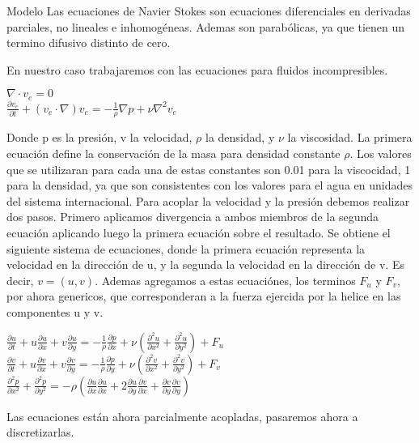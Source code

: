 
\begin{section}{Modelo}
Las ecuaciones de Navier Stokes son ecuaciones diferenciales en derivadas parciales, no lineales e inhomogéneas. Ademas son parabólicas, ya que tienen un termino difusivo distinto de cero.

En nuestro caso trabajaremos con las ecuaciones para fluidos incompresibles.
\begin{center}
$\nabla \cdot v_e = 0$\\
$\frac{\partial v_e}{\partial t} + (v_e \cdot \nabla)v_e = -\frac{1}{\rho}\nabla p+\nu \nabla^2v_e$
\end{center}

Donde p es la presión, v la velocidad, $\rho$ la densidad, y $\nu$ la viscosidad. La primera ecuación define la conservación de la masa para densidad constante $\rho$. 
Los valores que se utilizaran para cada una de estas constantes son 0.01 para la viscocidad, 1 para la densidad, ya que son consistentes con los valores para el agua en unidades del sistema internacional.
Para acoplar la velocidad y la presión debemos realizar dos pasos. Primero aplicamos divergencia a ambos miembros de la segunda ecuación aplicando luego la primera ecuación sobre el resultado. Se obtiene el siguiente sistema de ecuaciones, donde la primera ecuación representa la velocidad en la dirección de u, y la segunda la velocidad en la dirección de v. Es decir, $v=(u,v)$. Ademas agregamos a estas ecuaciónes, los terminos $F_u$ y $F_v$, por ahora genericos, que corresponderan a la fuerza ejercida por la helice en las componentes u y v.
~\\

\begin{center}

$\frac{\partial u}{\partial t} + u \frac{\partial u}{\partial x} + v \frac{\partial u}{\partial y} = -\frac{1}{\rho} \frac{\partial p}{\partial x} + \nu ( \frac{\partial ^2 u}{\partial x^2} + \frac{\partial ^2 u}{\partial y^2}) + F_u$
~\\
$\frac{\partial v}{\partial t} + u \frac{\partial v}{\partial x} + v \frac{\partial v}{\partial y} = -\frac{1}{\rho} \frac{\partial p}{\partial y} + \nu ( \frac{\partial ^2 v}{\partial x^2} + \frac{\partial ^2 v}{\partial y^2}) + F_v$
~\\
$\frac{\partial ^2 p}{\partial x^2} + \frac{\partial ^2 p}{\partial y^2} = - \rho(\frac{\partial u}{\partial x} \frac{\partial u}{\partial x}  + 2 \frac{\partial u}{\partial y}  \frac{\partial v}{\partial x} + \frac{\partial v}{\partial y} \frac{\partial v}{\partial y}  )$


\end{center}

Las ecuaciones están ahora parcialmente acopladas, pasaremos ahora a discretizarlas.
\end{section}


